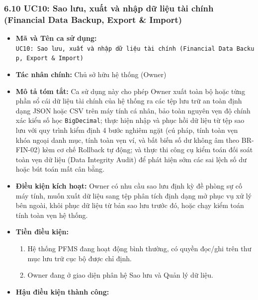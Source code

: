 \documentclass[11pt,a4paper]{article}
\providecommand{\tightlist}{
  \setlength{\itemsep}{0pt}\setlength{\parskip}{0pt}}
\begin{document}
\subsubsection{6.10 UC10: Sao lưu, xuất và nhập dữ liệu tài chính
(Financial Data Backup, Export \&
Import)}\label{610-uc10-sao-lux1b0u-xuux1ea5t-vuxe0-nhux1eadp-dux1eef-liux1ec7u-tuxe0i-chuxednh-financial-data-backup-export--import}

\begin{itemize}
\tightlist
\item
  \textbf{Mã và Tên ca sử dụng:}
  \texttt{UC10:\ Sao\ lưu,\ xuất\ và\ nhập\ dữ\ liệu\ tài\ chính\ (Financial\ Data\ Backup,\ Export\ \&\ Import)}
\item
  \textbf{Tác nhân chính:} Chủ sở hữu hệ thống (Owner)
\item
  \textbf{Mô tả tóm tắt:} Ca sử dụng này cho phép Owner xuất toàn bộ
  hoặc từng phần sổ cái dữ liệu tài chính của hệ thống ra các tệp lưu
  trữ an toàn định dạng JSON hoặc CSV trên máy tính cá nhân, bảo toàn
  nguyên vẹn độ chính xác kiểu số học \texttt{BigDecimal}; thực hiện
  nhập và phục hồi dữ liệu từ tệp sao lưu với quy trình kiểm định 4 bước
  nghiêm ngặt (cú pháp, tính toàn vẹn khóa ngoại danh mục, tính toàn vẹn
  ví, và bất biến số dư không âm theo BR-FIN-02) kèm cơ chế Rollback tự
  động; và thực thi công cụ kiểm toán đối soát toàn vẹn dữ liệu (Data
  Integrity Audit) để phát hiện sớm các sai lệch số dư hoặc bút toán mất
  cân bằng.
\item
  \textbf{Điều kiện kích hoạt:} Owner có nhu cầu sao lưu định kỳ đề
  phòng sự cố máy tính, muốn xuất dữ liệu sang tệp phân tích định dạng
  mở phục vụ xử lý bên ngoài, khôi phục dữ liệu từ bản sao lưu trước đó,
  hoặc chạy kiểm toán tính toàn vẹn hệ thống.
\item
  \textbf{Tiền điều kiện:}

  \begin{enumerate}
  \def\labelenumi{\arabic{enumi}.}
  \tightlist
  \item
    Hệ thống PFMS đang hoạt động bình thường, có quyền đọc/ghi trên thư
    mục lưu trữ cục bộ được chỉ định.
  \item
    Owner đang ở giao diện phân hệ Sao lưu và Quản lý dữ liệu.
  \end{enumerate}
\item
  \textbf{Hậu điều kiện thành công:}


\end{itemize}
\end{document}
